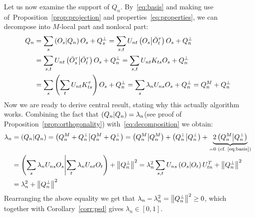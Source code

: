 Let us now examine the support of \(Q_n\). By~\eqref{eq:basis} and making use of~Proposition~\ref{prop:projection}
and properties~\eqref{eq:properties}, we can decompose into \(M\)-local part and nonlocal part:
\begin{align}
  Q_n &=  \sum_s \left(O_s \middle| Q_n\right)O_s + Q_s^{\perp} = \sum_{s,t} U_{n t}\left(O_{s} \middle| \bar{O}_{t}^{\tau}\right)
  O_{s}+Q_{n}^{\perp} \nonumber \\
  &= \sum_{s,t} U_{n t}\left(\bar{O}_{s}^{\tau} \middle| \bar{O}_{t}^{\tau}\right) O_{s}+Q_{n}^{\perp}
  = \sum_{s,t} U_{n t}K_{ts} O_{s}+Q_{n}^{\perp} \nonumber \\
  &= \sum_s  \left( \sum_t U_{n t}K_{ts}^{\tau}\right) O_{s}+Q_{n}^{\perp} = \sum_{s} 
  \lambda_{n} U_{n s} O_{s}+Q_{n}^{\perp} = Q_{n}^{M}+Q_{n}^{\perp}
  \label{eq:decomposition}
\end{align}
Now we are ready to derive central result, stating why this actually algorithm works. Combining the fact that 
\(\left(Q_n \middle| Q_n\right) = \lambda_n \)(see proof of Proposition~\ref{prop:orthogonality}) with~\eqref{eq:decomposition} we obtain:
\begin{align}
  \lambda_n &= \left(Q_n \middle| Q_n\right) = \left(Q_n^M + Q_n^{\perp} \middle| Q_n^M + Q_n^{\perp}\right) = \left(Q_n^M \middle| Q_n^M\right) +
   \left(Q_n^{\perp} \middle| Q_n^{\perp}\right) + \underbrace{2 \left(Q_n^M \middle| Q_n^{\perp}\right)}_{=0 \text{ (cf.~\eqref{eq:basis})}} \nonumber \\
   &= \left(\sum_s \lambda_n U_{ns} O_s \middle| \sum_t \lambda_n U_{nt} O_t\right) + \norm{Q_n^{\perp}}^2 =
  \lambda_n^2 \sum_{s,t} U_{ns} \left(O_s \middle| O_t\right) U_{tn}^{T} + \norm{Q_n^{\perp}}^2  \nonumber \\
  &=\lambda_n^2 + \norm{Q_n^{\perp}}^2
\end{align}
Rearranging the above equality we get that \(\lambda_n - \lambda_n^2 = \norm{Q_n^{\perp}}^2 \geq 0\), which together with
Corollary~\ref{corr:psd} gives \(\lambda_n \in \left[0,1\right]\). 


